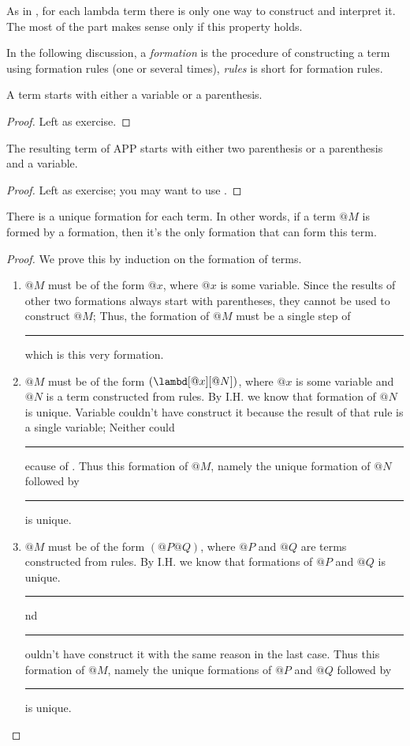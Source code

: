\documentclass[../../../include/open-logic-section]{subfiles}
\begin{document}

As in \olref[fol][syn][unq], for each lambda term there is only one
way to construct and interpret it. The most of the part makes
sense only if this property holds.

In the following discussion, a \emph{formation} is the procedure of
constructing a term using formation rules (one or several times), \emph{rules} is short for
formation rules. 

\begin{lem}
  A term starts with either a variable or a parenthesis.
\end{lem}
\begin{proof}
  Left as exercise.
\end{proof}

\begin{lem}
  The resulting term of APP starts with either two parenthesis or a
  parenthesis and a variable.
\end{lem}
\begin{proof}
  Left as exercise; you may want to use .
\end{proof}

\begin{prop}
There is a unique formation for each term. In other words, if a term
$@M$ is formed by a formation, then it's the only formation that can form this term.
\end{prop}

\begin{proof}
  We prove this by induction on the formation of terms. 

  \begin{enumerate}
    \item[\rule{VAR}] $@M$ must be of the form
      $@x$, where $@x$ is some variable. Since the results of other two
      formations always start with parentheses, they cannot be used to
      construct $@M$; Thus, the formation of $@M$ must be a single step
      of \rule{VAR}, which is this very formation.
    \item[\rule{ABS}] $@M$ must be of the
      form $(\lambd[@x][@N])$, where $@x$ is some variable and $@N$ is a
      term constructed from rules. By I.H. we know that formation of
      $@N$ is unique. Variable couldn't have construct it
      because the result of that rule is a single variable;
      Neither could \rule{APP} because of . Thus
      this formation of $@M$, namely the unique formation of $@N$
      followed by \rule{ABS}, is unique.

    \item[\rule{APP}] $@M$ must be of the form
      $(@P@Q)$, where $@P$ and $@Q$ are terms constructed from rules. By
      I.H. we know that formations of $@P$ and $@Q$ is unique. \rule{VAR} and
      \rule{ABS} couldn't have construct it with the same reason in the 
      last case. Thus this formation of $@M$, namely the unique
      formations of $@P$ and $@Q$ followed by \rule{APP}, is unique.
  \end{enumerate}
\end{proof}
\end{document}
